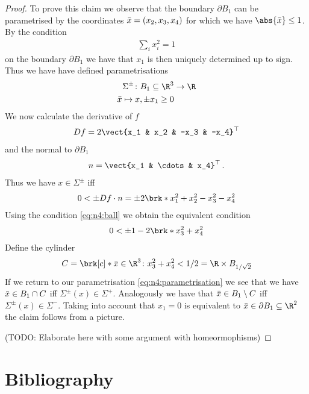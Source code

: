 \begin{proof}
To prove this claim we observe that the boundary $\partial B_1$ can be parametrised by the coordinates $\bar{x} = (x_2,x_3,x_4)$
for which we have $\abs{\bx}\leq 1$. By the condition
\begin{align}
  \sum_i x_i^2 = 1\label{eq:n4:ball}
\end{align}
on the boundary $\partial B_1$ we have that $x_1$ is then uniquely determined up to sign. Thus we have have defined parametrisations
\begin{align}
  \begin{aligned}\Sigma^\pm\colon B_1\subseteq\R^3&\to\R \\
  \bx\mapsto x, \pm x_1\geq0
  \end{aligned}\label{eq:n4:parametrisation}
\end{align}
We now calculate the derivative of $f$
\begin{align*}
  Df = 2\vect{x_1 & x_2 & -x_3 & -x_4}^\top
\end{align*}
and the normal to $\partial B_1$
\begin{align*}
  n = \vect{x_1 & \cdots & x_4}^\top\,.
\end{align*}
Thus we have $x\in\Sigma^\pm$ iff
\begin{align*}
  0<\pm Df\cdot n = \pm 2\brk*{x_1^2+x_2^2-x_3^2-x_4^2}
\end{align*}
Using the condition \eqref{eq:n4:ball} we obtain the equivalent condition
\begin{align*}
  0<\pm 1-2\brk*{x_3^2+x_4^2}
\end{align*}
Define the cylinder
\begin{align*}
  C = \brk[c]*{\bx\in \R^3\colon x_3^2+x_4^2<1/2} = \R\times B_{1/\sqrt{2}}
\end{align*}
If we return to our parametrisation \eqref{eq:n4:parametrisation} we see that we have $\bar{x}\in B_1\cap C$ iff
$\Sigma^\pm(x)\in \Sigma^+$. Analogously  we have that $\bar{x}\in B_1\setminus C$ iff
$\Sigma^\pm(x)\in \Sigma^-$. Taking into account that $x_1=0$ is equivalent to $\bx\in \partial B_1\subseteq \R^2$
the claim follows from a picture.

(TODO: Elaborate here with some argument with homeormophisms)
\end{proof}

\newpage

\section*{Bibliography}
\nocite{*}
\printbibliography[heading=none]



